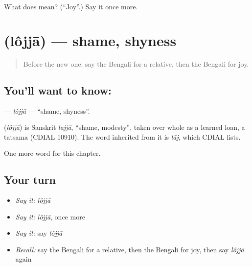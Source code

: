 \begin{tcolorbox}[breakable,colback=teal!4,colframe=teal!35!black,title={Before you move on}]
What does  mean? (\textquotedblleft{}Joy\textquotedblright{}.) Say it once more.
\end{tcolorbox}
\section[\texorpdfstring{\bn{লজ্জা} (lôjjā)}{লজ্জা (lôjjā)}]{ (lôjjā) — shame, shyness}

\label{lesson:BN-C169-lojja}



\begin{quote}
Before the new one: say the Bengali for a relative, then the Bengali for joy.
\end{quote}

\subsection*{You'll want to know: }
\textbf{} — \emph{lôjjā} — \textquotedblleft{}shame, shyness\textquotedblright{}.

\begin{cousinweb}
\textbf{} (\emph{lôjjā}) is Sanskrit \emph{lajjā}, \textquotedblleft{}shame, modesty\textquotedblright{}, taken over whole as a learned loan, a tatsama (CDIAL 10910). The word inherited from it is \emph{lāj}, which CDIAL lists.
\end{cousinweb}

\begin{grammarlens}[title={What you've built}]
One more word for this chapter.
\end{grammarlens}

\subsection*{Your turn}
\begin{itemize}
\raggedright
  \item \emph{Say it:} \emph{lôjjā}
  \item \emph{Say it:} \emph{lôjjā}, once more
  \item \emph{Say it:} say \emph{lôjjā}
  \item \emph{Recall:} say the Bengali for a relative, then the Bengali for joy, then say \emph{lôjjā} again
\end{itemize}

